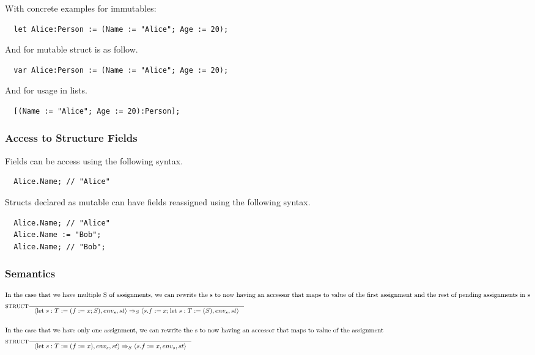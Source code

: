With concrete examples for immutables:

\begin{verbatim}
  let Alice:Person := (Name := "Alice"; Age := 20);
\end{verbatim}

And for mutable struct is as follow.

\begin{verbatim}
  var Alice:Person := (Name := "Alice"; Age := 20);
\end{verbatim}

And for usage in lists.

\begin{verbatim}
  [(Name := "Alice"; Age := 20):Person];
\end{verbatim}

\subsubsection{Access to Structure Fields}
\label{sec:accessStructFields}

Fields can be access using the following syntax.

\begin{verbatim}
  Alice.Name; // "Alice"
\end{verbatim}

Structs declared as mutable can have fields reassigned using the following syntax.

\begin{verbatim}
  Alice.Name; // "Alice"
  Alice.Name := "Bob";
  Alice.Name; // "Bob";
\end{verbatim}
 
\subsubsection{Semantics}

\begin{align*}
\intertext{In the case that we have multiple S of assignments, we can rewrite the s to now having an accessor that maps to value of the first assignment and the rest of pending assignments in s}
&\inference[$\text{STRUCT}$]{}
                            {\Braket{\Tlet \; s:T := (f := x;S),env_s,st} \Rightarrow_S \Braket{s.f := x;\Tlet \; s:T := (S),env_s,st}}
\\\\
\intertext{In the case that we have only one assignment, we can rewrite the s to now having an accessor that maps to value of the assignment}
&\inference[$\text{STRUCT}$]{}
                            {\Braket{\Tlet \; s:T := (f := x),env_s,st} \Rightarrow_S \Braket{s.f := x,env_s,st}}
\end{align*}

